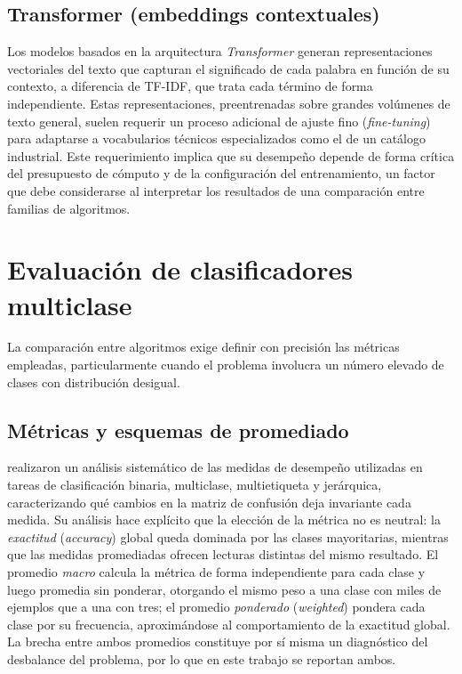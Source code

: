 \subsection{Transformer (embeddings contextuales)}
Los modelos basados en la arquitectura \textit{Transformer} \cite{vaswani2017} generan representaciones vectoriales del texto que capturan el significado de cada palabra en función de su contexto, a diferencia de TF-IDF, que trata cada término de forma independiente. Estas representaciones, preentrenadas sobre grandes volúmenes de texto general, suelen requerir un proceso adicional de ajuste fino (\textit{fine-tuning}) para adaptarse a vocabularios técnicos especializados como el de un catálogo industrial. Este requerimiento implica que su desempeño depende de forma crítica del presupuesto de cómputo y de la configuración del entrenamiento, un factor que debe considerarse al interpretar los resultados de una comparación entre familias de algoritmos.

\section{Evaluación de clasificadores multiclase}
La comparación entre algoritmos exige definir con precisión las métricas empleadas, particularmente cuando el problema involucra un número elevado de clases con distribución desigual.

\subsection{Métricas y esquemas de promediado}
 realizaron un análisis sistemático de las medidas de desempeño utilizadas en tareas de clasificación binaria, multiclase, multietiqueta y jerárquica, caracterizando qué cambios en la matriz de confusión deja invariante cada medida. Su análisis hace explícito que la elección de la métrica no es neutral: la \textit{exactitud} (\textit{accuracy}) global queda dominada por las clases mayoritarias, mientras que las medidas promediadas ofrecen lecturas distintas del mismo resultado. El promedio \textit{macro} calcula la métrica de forma independiente para cada clase y luego promedia sin ponderar, otorgando el mismo peso a una clase con miles de ejemplos que a una con tres; el promedio \textit{ponderado} (\textit{weighted}) pondera cada clase por su frecuencia, aproximándose al comportamiento de la exactitud global. La brecha entre ambos promedios constituye por sí misma un diagnóstico del desbalance del problema, por lo que en este trabajo se reportan ambos.

